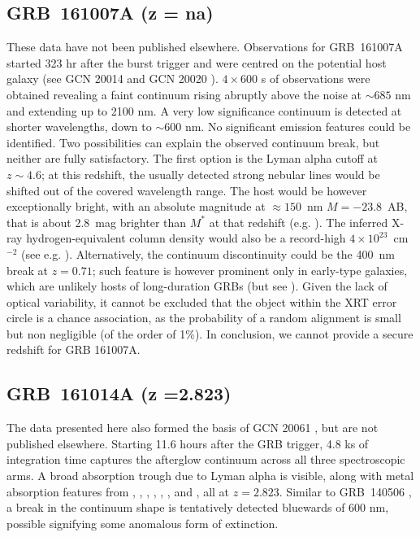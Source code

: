\documentclass[longauth]{aa}    %
\begin{document}
\subsection{GRB~161007A (z = na)} \label{161007}

These data have not been published elsewhere. Observations for GRB~161007A
started 323 hr after the burst trigger and were centred on the potential host
galaxy (see GCN 20014 \citep{GCN20014} and GCN 20020 \citep{GCN20020}). $4
\times 600$ s of observations were obtained revealing a faint continuum rising
abruptly above the noise at $\sim 685$ nm and extending up to 2100 nm. A very
low significance continuum is detected at shorter wavelengths, down to $\sim
600$ nm. No significant emission features could be identified. Two possibilities
can explain the observed continuum break, but neither are fully satisfactory.
The first option is the Lyman alpha cutoff at $z \sim 4.6$; at this redshift, the
usually detected strong nebular lines would be shifted out of the covered
wavelength range. The host would be however exceptionally bright, with an
absolute magnitude at $\approx 150$~nm{} $M = -23.8$~AB, that is about 2.8~mag
brighter than $M^*$ at that redshift (e.g. \citealt{Bouwens2015}). The inferred
X-ray hydrogen-equivalent column density would also be a record-high $4 \times
10^{23}$~cm$^{-2}$ (see e.g. \citealt{Campana2012}). Alternatively, the
continuum discontinuity could be the 400~nm{} break at $z = 0.71$; such
feature is however prominent only in early-type galaxies, which are unlikely
hosts of long-duration GRBs (but see \citealt{Rossi2014}). Given the lack of
optical variability, it cannot be excluded that the object within the XRT error
circle is a chance association, as the probability of a random alignment is
small but non negligible (of the order of 1\%). In conclusion, we cannot provide
a secure redshift for GRB 161007A.

\subsection{GRB~161014A (z =2.823)} \label{161014}

The data presented here also formed the basis of GCN  20061 \citep{GCN20061},
but are not published elsewhere. Starting 11.6 hours after the GRB trigger, 4.8
ks of integration time captures the afterglow continuum across all three
spectroscopic arms. A broad absorption trough due to Lyman alpha is visible,
along with metal absorption features from \mgii, \SIii, \cii, \civ, \alii,
\aliii, and	\feii, all at $z =2.823$. Similar to GRB~140506 \citep{Fynbo2014,
	Heintz2017b}, a break in the continuum shape is tentatively detected bluewards
of 600 nm, possible signifying some anomalous form of extinction.
\end{document}

